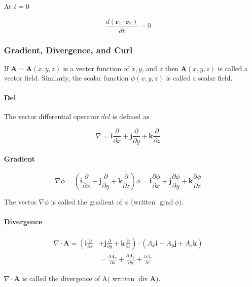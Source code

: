 \documentclass[10pt]{article}
\numberwithin{equation}{section}
\begin{document}
At $t=0$

$$
\frac{d\left(\mathbf{r}_{1} \cdot \mathbf{r}_{2}\right)}{d t}=0
$$

\subsubsection{Gradient, Divergence, and Curl}\label{sec:1-9-2}
If $\mathbf{A}=\mathbf{A}(x, y, z)$ is a vector function of $x, y$, and $z$ then $\mathbf{A}(x, y, z)$ is called a vector field. Similarly, the scalar function $\phi(x, y, z)$ is called a scalar field.

\paragraph{Del}\label{sec:1-9-2-1}
The vector differential operator $d e l$ is defined as

$$
\nabla=\mathbf{i} \frac{\partial}{\partial x}+\mathbf{j} \frac{\partial}{\partial y}+\mathbf{k} \frac{\partial}{\partial z}
$$

\paragraph{Gradient}\label{sec:1-9-2-2}
$$
\nabla \phi=\left(\mathbf{i} \frac{\partial}{\partial x}+\mathbf{j} \frac{\partial}{\partial y}+\mathbf{k} \frac{\partial}{\partial z}\right) \phi=\mathbf{i} \frac{\partial \phi}{\partial x}+\mathbf{j} \frac{\partial \phi}{\partial y}+\mathbf{k} \frac{\partial \phi}{\partial z}
$$

The vector $\nabla \phi$ is called the gradient of $\phi$ (written $\operatorname{grad} \phi)$.

\paragraph{Divergence}\label{sec:1-9-2-3}
$$
\begin{aligned}
\nabla \cdot \mathbf{A}=\left(\mathbf{i} \frac{\partial}{\partial x}\right. & \left.+\mathbf{j} \frac{\partial}{\partial y}+\mathbf{k} \frac{\partial}{\partial z}\right) \cdot\left(A_{x} \mathbf{i}+A_{y} \mathbf{j}+A_{z} \mathbf{k}\right) \\
& =\frac{\partial A_{x}}{\partial x}+\frac{\partial A_{y}}{\partial y}+\frac{\partial A_{z}}{\partial z}
\end{aligned}
$$

$\nabla \cdot \mathbf{A}$ is called the divergence of $\mathrm{A}($ written $\operatorname{div} \mathbf{A})$.
\end{document}
